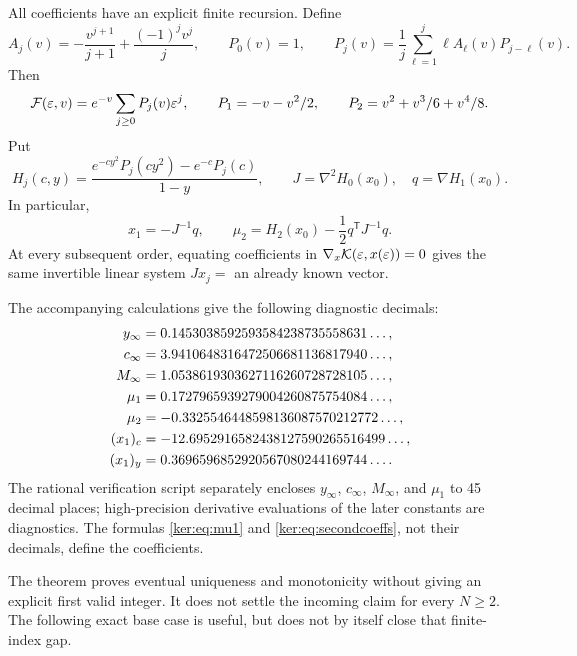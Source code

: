 All coefficients have an explicit finite recursion. Define
\begin{equation}\label{ker:eq:coefficient-recursion}
 A_j(v)=-\frac{v^{j+1}}{j+1}+\frac{(-1)^jv^j}{j},\qquad
 P_0(v)=1,\qquad
 P_j(v)=\frac1j\sum_{\ell=1}^j\ell A_\ell(v)P_{j-\ell}(v).
\end{equation}
Then
\[
 \mathcal F(\varepsilon,v)=e^{-v}\sum_{j\ge0}P_j(v)\varepsilon^j,
 \qquad P_1=-v-v^2/2,\qquad P_2=v^2+v^3/6+v^4/8.
\]
Put
\[
 H_j(c,y)=\frac{e^{-cy^2}P_j(cy^2)-e^{-c}P_j(c)}{1-y},
 \qquad J=\nabla^2H_0(x_0),\quad q=\nabla H_1(x_0).
\]
In particular,
\begin{equation}\label{ker:eq:secondcoeffs}
 x_1=-J^{-1}q,\qquad
 \mu_2=H_2(x_0)-\frac12q^{\mathsf T}J^{-1}q.
\end{equation}
At every subsequent order, equating coefficients in
$\nabla_x\mathcal K(\varepsilon,x(\varepsilon))=0$ gives the same invertible
linear system $Jx_j=$ an already known vector.

The accompanying calculations give the following diagnostic decimals:
\begin{align}
 y_\infty&=0.1453038592593584238735558631\ldots,\notag\\
 c_\infty&=3.9410648316472506681136817940\ldots,\notag\\
 M_\infty&=1.0538619303627116260728728105\ldots,\label{ker:eq:decimals}\\
 \mu_1&=0.1727965939279004260875754084\ldots,\notag\\
 \mu_2&=-0.3325546448598136087570212772\ldots,\notag\\
 (x_1)_c&=-12.6952916582438127590265516499\ldots,\notag\\
 (x_1)_y&=0.3696596852920567080244169744\ldots.\notag
\end{align}
The rational verification script separately encloses $y_\infty$,
$c_\infty$, $M_\infty$, and $\mu_1$ to 45 decimal places;
high-precision derivative evaluations of the later constants
are diagnostics. The formulas \eqref{ker:eq:mu1} and
\eqref{ker:eq:secondcoeffs}, not their decimals, define the coefficients.



\begin{remark}
The theorem proves eventual uniqueness and monotonicity without giving
an explicit first valid integer. It does not settle the incoming claim
for every $N\ge2$. The following exact base case is useful, but does
not by itself close that finite-index gap.
\end{remark}

